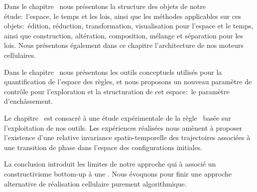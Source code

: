 \begin{small}
Dans le chapitre~ nous pr\'esentons la
structure des objets de notre \'etude:~l'espace, le temps et les lois, %
ainsi que les m\'ethodes applicables sur ces objets:~\'edition, r\'eduction,
transformation, visualisation pour l'espace et le temps, ainsi que
construction, alt\'eration, composition, m\'elange et s\'eparation pour les
lois. %
Nous pr\'esentons \'egalement dans ce chapitre l'architecture de nos
moteurs cellulaires. %

Dans le chapitre~ nous pr\'esentons les outils
conceptuels utilis\'es pour la quantification de l'espace des r\`egles, et
nous proposons un nouveau param\`etre de contr\^ole pour l'exploration et
la structuration de cet espace:~le param\`etre d'ench\^assement. %

Le chapitre~ est consacr\'e \`a une \'etude
exp\'erimentale de la r\`egle~ bas\'ee sur l'exploitation de nos outils. %
Les exp\'eriences r\'ealis\'ees nous am\`enent \`a proposer l'existence d'une
relative invariance spatio-temporelle des trajectoires associ\'ees \`a
une transition de phase dans l'espace des configurations initiales. %

La conclusion introduit les limites de notre approche qui \`a associ\'e
un constructivisme bottom-up \`a une . %
Nous \'evoquons pour finir une approche alternative de r\'ealisation
cellulaire purement algorithmique. %

\end{small}

